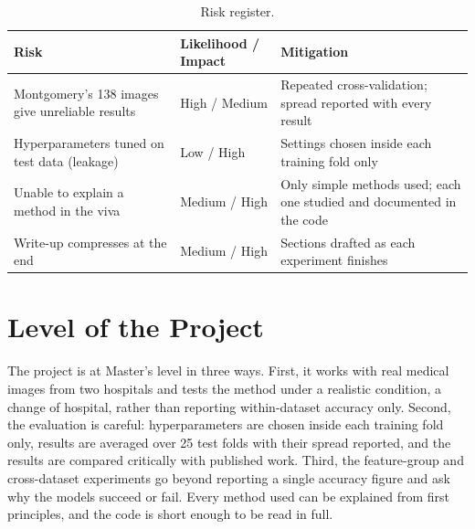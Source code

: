 \documentclass[11pt,a4paper]{article}
\begin{document}
\begin{table}[htbp]
  \centering
  \caption{Risk register.}
  \label{tab:risk}
  \small
  \begin{tabularx}{\linewidth}{X l X}
    \toprule
    \textbf{Risk} & \textbf{Likelihood / Impact} & \textbf{Mitigation} \\
    \midrule
    Montgomery's 138 images give unreliable results & High / Medium & Repeated cross-validation; spread reported with every result \\
    Hyperparameters tuned on test data (leakage) & Low / High & Settings chosen inside each training fold only \\
    Unable to explain a method in the viva & Medium / High & Only simple methods used; each one studied and documented in the code \\
    Write-up compresses at the end & Medium / High & Sections drafted as each experiment finishes \\
    \bottomrule
  \end{tabularx}
\end{table}

\section{Level of the Project}
The project is at Master's level in three ways. First, it works with real medical images from two hospitals and tests the method under a realistic condition, a change of hospital, rather than reporting within-dataset accuracy only. Second, the evaluation is careful: hyperparameters are chosen inside each training fold only, results are averaged over 25 test folds with their spread reported, and the results are compared critically with published work. Third, the feature-group and cross-dataset experiments go beyond reporting a single accuracy figure and ask why the models succeed or fail. Every method used can be explained from first principles, and the code is short enough to be read in full.

\clearpage{}
{}


\end{document}
